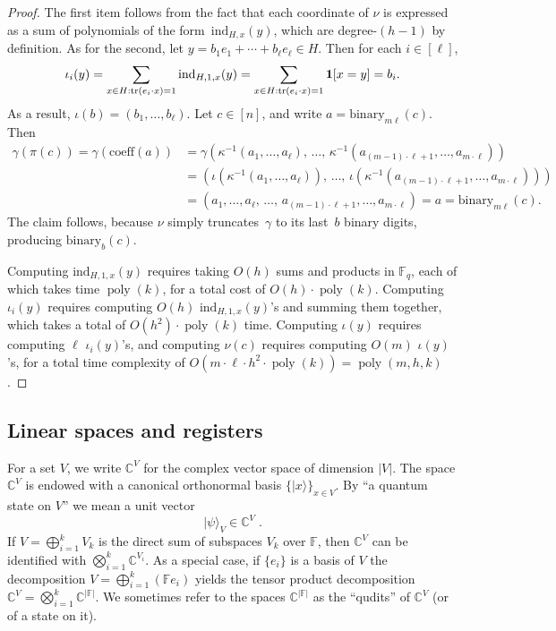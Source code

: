 \documentclass[11pt]{article}
\theoremstyle{definition}
\newcommand{\ket}[1]{|#1\rangle}
\newcommand{\C}{\ensuremath{\mathbb{C}}}
\newcommand{\complex}{\ensuremath{\mathbb{C}}}
\newcommand{\F}{\ensuremath{\mathbb{F}}}
\newcommand{\downsize}{\kappa}
\newcommand{\ind}{\ensuremath{\textrm{ind}}}
\DeclareMathOperator{\poly}{poly}
\newcommand{\abs}[1]{\left\vert {#1} \right\vert}
\DeclareMathOperator{\tr}{tr}
\newcommand{\binary}[1]{\mathrm{binary}_{#1}}
\begin{document}
\begin{proof}
  The first item follows from the fact that each coordinate of $\nu$ is
  expressed as a sum of polynomials of the form~$\ind_{H,x}(y)$, which are
  degree-$(h-1)$ by definition.
  As for the second, let $y = b_1 e_1 + \cdots + b_\ell e_\ell \in H$.
  Then for each $i \in [\ell]$,
  \begin{equation*}
    \iota_i(y) = \sum_{x \in H: \tr(e_i \cdot x) = 1} \ind_{H,1,x}(y)
    = \sum_{x \in H : \tr(e_i \cdot x) = 1} \bold{1}[x = y]
    = b_i.
  \end{equation*}
  As a result, $\iota(b) = (b_1, \ldots, b_\ell)$.
  Let $c \in [n]$, and write $a = \binary{m\ell}(c)$.
  Then
  \begin{align*}
    \gamma(\pi(c)) = \gamma(\mathrm{coeff}(a))
    & = \gamma(\downsize^{-1}(a_1, \ldots, a_\ell),\, \ldots,\,
      \downsize^{-1}(a_{(m-1)\cdot \ell +1}, \ldots, a_{m \cdot \ell}))\\
    & = (\iota(\downsize^{-1}(a_1, \ldots, a_\ell)),\, \ldots,\,
      \iota(\downsize^{-1}(a_{(m-1)\cdot \ell +1}, \ldots, a_{m \cdot \ell})))\\
    & = (a_1, \ldots, a_\ell,\, \ldots,\, a_{(m-1)\cdot \ell + 1}, \ldots,
      a_{m\cdot \ell}) = a = \binary{m\ell}(c).
  \end{align*}
  The claim follows, because $\nu$ simply truncates~$\gamma$ to its last~$b$
  binary digits, producing $\binary{b}(c)$.

  Computing $\ind_{H,1, x}(y)$ requires taking $O(h)$ sums and products in
  $\F_q$, each of which takes time $\poly(k)$, for a total cost of $O(h) \cdot
  \poly(k)$.
  Computing $\iota_i(y)$ requires computing $O(h)$ $\ind_{H,1, x}(y)$'s and
  summing them together, which takes a total of $O(h^2) \cdot \poly(k)$ time.
  Computing $\iota(y)$ requires computing $\ell$ $\iota_i(y)$'s, and computing
  $\nu(c)$ requires computing $O(m)$ $\iota(y)$'s, for a total time complexity
  of $O(m \cdot \ell \cdot h^2 \cdot \poly(k)) = \poly(m, h, k)$.
\end{proof}

\subsection{Linear spaces and registers}
\label{sec:lin-reg}

For a set $V$, we write $\C^V$ for the complex vector space of dimension $|V|$.
The space $\C^V$ is endowed with a canonical orthonormal basis
$\{\ket{x}\}_{x\in V}$.
By ``a quantum state on $V$'' we mean a unit vector
\begin{equation*}
  \ket{\psi}_V \in \complex^V\;.
\end{equation*}
If $V = \bigoplus_{i=1}^k V_k$ is the direct sum of subspaces $V_k$ over $\F$,
then $\complex^V$ can be identified with $\bigotimes_{i=1}^k \complex^{V_i}$.
As a special case, if $\{e_i\}$ is a basis of $V$ the decomposition $V =
\bigoplus_{i=1}^k ( \F e_i)$ yields the tensor product decomposition $\C^V =
\bigotimes_{i=1}^k \C^{\abs{\F}}$.
We sometimes refer to the spaces $\C^{\abs{\F}}$ as the ``qudits'' of $\C^V$ (or
of a state on it).
\end{document}
